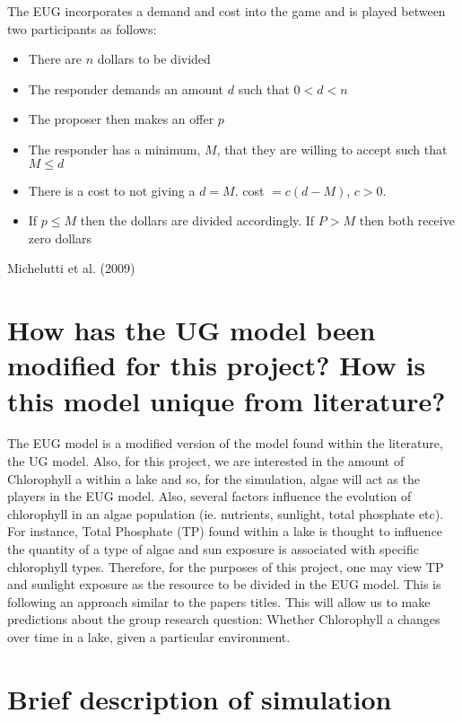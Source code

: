 \documentclass[]{article}
\begin{document}
The EUG incorporates a demand and cost into the game and is played
between two participants as follows:

\begin{itemize}
    \item There are $n$ dollars to be divided 
    \item The responder demands an amount $d$ such that $0<d<n$
    \item The proposer then makes an offer $p$
    \item The responder has a minimum, $M$, that they are willing to accept such that $M \leq d$
    \item There is a cost to not giving a $d = M$. cost $= c(d-M)$, $c>0$.
    \item If $p \leq M$ then the dollars are divided accordingly. If $P>M$ then both receive zero dollars
\end{itemize}

Michelutti et al. (2009)

\section{How has the UG model been modified for this project? How is
this model unique from
literature?}\label{how-has-the-ug-model-been-modified-for-this-project-how-is-this-model-unique-from-literature}

The EUG model is a modified version of the model found within the
literature, the UG model. Also, for this project, we are interested in
the amount of Chlorophyll a within a lake and so, for the simulation,
algae will act as the players in the EUG model. Also, several factors
influence the evolution of chlorophyll in an algae population (ie.
nutrients, sunlight, total phosphate etc). For instance, Total Phosphate
(TP) found within a lake is thought to influence the quantity of a type
of algae and sun exposure is associated with specific chlorophyll types.
Therefore, for the purposes of this project, one may view TP and
sunlight exposure as the resource to be divided in the EUG model. This
is following an approach similar to the papers titles. This will allow
us to make predictions about the group research question: Whether
Chlorophyll a changes over time in a lake, given a particular
environment.

\section{Brief description of
simulation}\label{brief-description-of-simulation}
\end{document}
